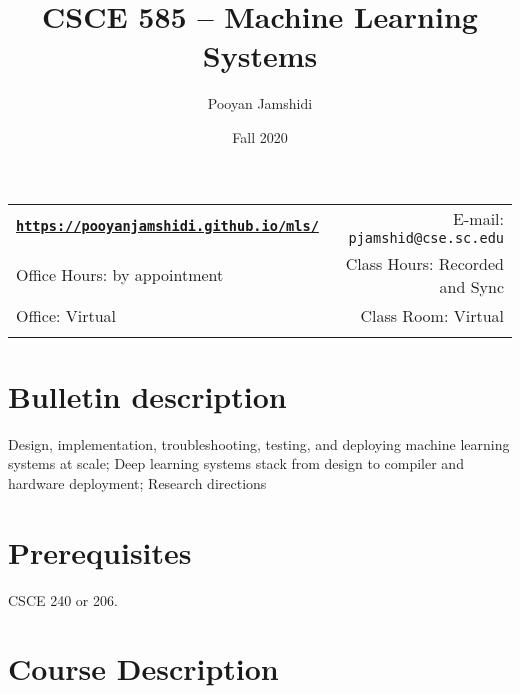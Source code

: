 \documentclass[11pt]{article}
\title{CSCE 585 -- Machine Learning Systems}
\author{Pooyan Jamshidi}
\date{Fall 2020}
\newcommand{\blankline}{\quad\pagebreak[2]}
\begin{document}
\maketitle

\blankline

\begin{tabular*}{.93\textwidth}{@{\extracolsep{\fill}}lr}


\href{https://pooyanjamshidi.github.io/mls/}{\tt\bf https://pooyanjamshidi.github.io/mls/}  & E-mail: \texttt{pjamshid@cse.sc.edu} \\

Office Hours: by appointment  &  Class Hours: Recorded and Sync \\

Office: Virtual & Class Room: Virtual \\
&  \\

\hline
\end{tabular*}

\vspace{10mm}

\section*{Bulletin description}
Design, implementation, troubleshooting, testing, and deploying machine learning systems at scale; Deep learning systems stack from design to compiler and hardware deployment; Research directions

\section*{Prerequisites}
CSCE 240 or 206.

\section*{Course Description}
\end{document}
